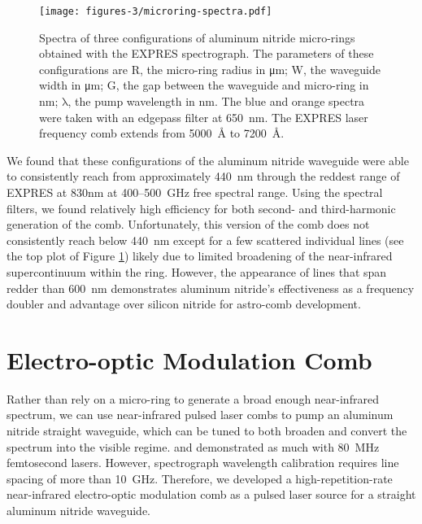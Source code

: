 \begin{figure}
    \centering
    \texttt{[image: figures-3/microring-spectra.pdf]}
    \caption[EXPRES-measured spectra from aluminum nitride micro-rings]{Spectra of three configurations of aluminum nitride micro-rings obtained with the EXPRES spectrograph. The parameters of these configurations are R, the micro-ring radius in \si{\micro\meter}; W, the waveguide width in \si{\micro\meter}; G, the gap between the waveguide and micro-ring in \si{\nano\meter}; $\mathrm{\lambda}$, the pump wavelength in \si{\nano\meter}. The blue and orange spectra were taken with an edgepass filter at 650~\si{\nano\meter}. The EXPRES laser frequency comb extends from 5000~\si{\angstrom} to 7200~\si{\angstrom}.}
    \label{fig:microring-spectra}
\end{figure}

We found that these configurations of the aluminum nitride waveguide were able to consistently reach from approximately 440~\si{\nano\meter} through the reddest range of EXPRES at 830\si{\nano\meter} at 400--500~\si{\giga\hertz} free spectral range. Using the spectral filters, we found relatively high efficiency for both second- and third-harmonic generation of the comb. Unfortunately, this version of the comb does not consistently reach below 440~\si{\nano\meter} except for a few scattered individual lines (see the top plot of Figure \ref{fig:microring-spectra}) likely due to limited broadening of the near-infrared supercontinuum within the ring. However, the appearance of lines that span redder than 600~\si{\nano\meter} demonstrates aluminum nitride's effectiveness as a frequency doubler and advantage over silicon nitride for astro-comb development.

\section{Electro-optic Modulation Comb} \label{astro-comb:eom}

Rather than rely on a micro-ring to generate a broad enough near-infrared spectrum, we can use near-infrared pulsed laser combs to pump an aluminum nitride straight waveguide, which can be tuned to both broaden and convert the spectrum into the visible regime. \citet{liu_beyond_2019} and \citet{lu_ultraviolet_2020} demonstrated as much with 80~\si{\mega\hertz} femtosecond lasers. However, spectrograph wavelength calibration requires line spacing of more than 10~\si{\giga\hertz}. Therefore, we developed a high-repetition-rate near-infrared electro-optic modulation comb as a pulsed laser source for a straight aluminum nitride waveguide.

